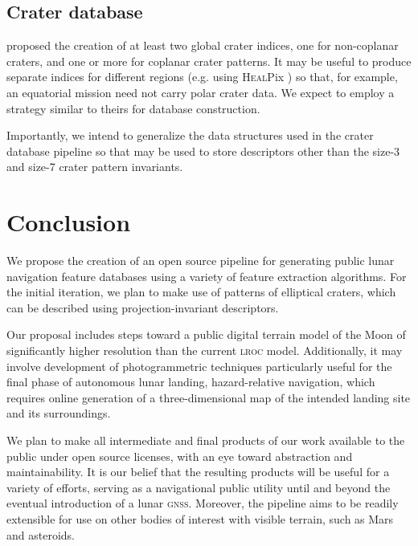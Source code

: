 \documentclass[12pt]{olfmemo}
\begin{document}
\subsection{Crater database}
\citet{Christian2020} proposed the creation of at least two global crater indices, one for non-coplanar craters, and one or more for coplanar crater patterns. It may be useful to produce separate indices for different regions (e.g. using \textsc{Heal}Pix \citep{Gorski2005}) so that, for example, an equatorial mission need not carry polar crater data. We expect to employ a strategy similar to theirs for database construction.


Importantly, we intend to generalize the data structures used in the crater database pipeline so that may be used to store descriptors other than the size-3 and size-7 crater pattern invariants.

\section{Conclusion}
We propose the creation of an open source pipeline for generating public lunar navigation feature databases using a variety of feature extraction algorithms. For the initial iteration, we plan to make use of patterns of elliptical craters, which can be described using projection-invariant descriptors.

Our proposal includes steps toward a public digital terrain model of the Moon of significantly higher resolution than the current \textsc{lroc} model. Additionally, it may involve development of photogrammetric techniques particularly useful for the final phase of autonomous lunar landing, hazard-relative navigation, which requires online generation of a three-dimensional map of the intended landing site and its surroundings.

We plan to make all intermediate and final products of our work available to the public under open source licenses, with an eye toward abstraction and maintainability. It is our belief that the resulting products will be useful for a variety of efforts, serving as a navigational public utility until and beyond the eventual introduction of a lunar \textsc{gnss}. Moreover, the pipeline aims to be readily extensible for use on other bodies of interest with visible terrain, such as Mars and asteroids.


\end{document}
